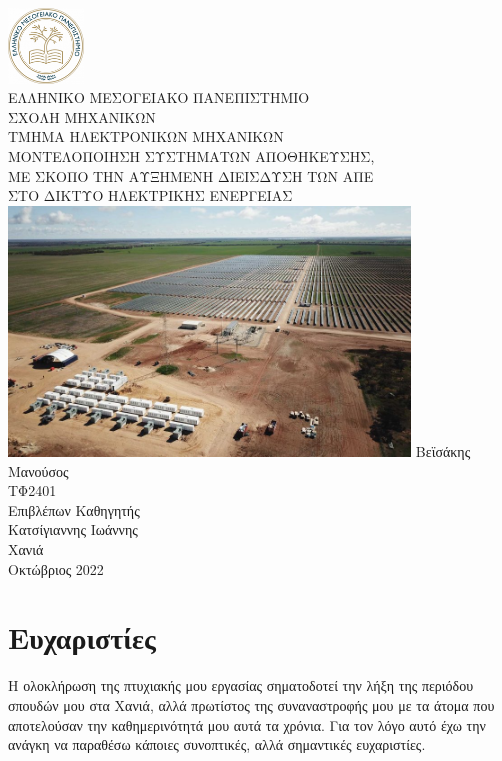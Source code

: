 \documentclass[12pt]{report}
\begin{document}
\sloppy
\begin{titlepage}
	\centering
	\includegraphics[width=0.15\textwidth]{hmu} \\ 
	\vspace{0.2cm}
	{\scshape ΕΛΛΗΝΙΚΟ ΜΕΣΟΓΕΙΑΚΟ ΠΑΝΕΠΙΣΤΗΜΙΟ \\ ΣΧΟΛΗ ΜΗΧΑΝΙΚΩΝ \\ ΤΜΗΜΑ ΗΛΕΚΤΡΟΝΙΚΩΝ ΜΗΧΑΝΙΚΩΝ \\}
	\vspace{1.5cm}
	{\scshape\Large ΜΟΝΤΕΛΟΠΟΙΗΣΗ ΣΥΣΤΗΜΑΤΩΝ ΑΠΟΘΗΚΕΥΣΗΣ, \\ΜΕ ΣΚΟΠΟ ΤΗΝ ΑΥΞΗΜΕΝΗ ΔΙΕΙΣΔΥΣΗ ΤΩΝ ΑΠΕ \\ΣΤΟ ΔΙΚΤΥΟ ΗΛΕΚΤΡΙΚΗΣ ΕΝΕΡΓΕΙΑΣ \\}
	\vspace{1cm}
	\includegraphics[width=0.8\textwidth]{gannawarra2}
	\vfill
	Βεϊσάκης Μανούσος \\
	ΤΦ2401 \\
	\vspace{0.5cm}
	Eπιβλέπων Καθηγητής\\
	Κατσίγιαννης Ιωάννης \\
	\vspace{2cm}
	{\large Χανιά \\ Οκτώβριος 2022 \\}
\end{titlepage}

\tableofcontents
\chapter*{Ευχαριστίες}
Η ολοκλήρωση της πτυχιακής μου εργασίας σηματοδοτεί την λήξη της περιόδου σπουδών μου στα Χανιά, αλλά πρωτίστος της συναναστροφής μου με τα άτομα που αποτελούσαν την καθημερινότητά μου αυτά τα χρόνια.
Για τον λόγο αυτό έχω την ανάγκη να παραθέσω κάποιες συνοπτικές, αλλά σημαντικές ευχαριστίες.
\end{document}
